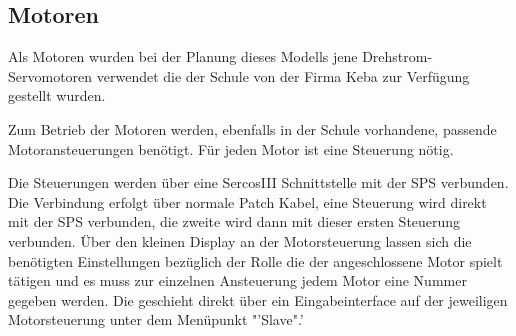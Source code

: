 \subsection{Motoren}
Als Motoren wurden bei der Planung dieses Modells jene Drehstrom-Servomotoren verwendet die der Schule von der Firma Keba zur Verfügung gestellt wurden. 

Zum Betrieb der Motoren werden, ebenfalls in der Schule vorhandene, passende Motoransteuerungen benötigt. Für jeden Motor ist eine Steuerung nötig. 

Die Steuerungen werden über eine SercosIII Schnittstelle mit der SPS verbunden. Die Verbindung erfolgt über normale Patch Kabel, eine Steuerung wird direkt mit der SPS verbunden, die zweite wird dann mit dieser ersten Steuerung verbunden. Über den kleinen Display an der Motorsteuerung lassen sich die benötigten Einstellungen bezüglich der Rolle die der angeschlossene Motor spielt tätigen und es muss zur einzelnen Ansteuerung jedem Motor eine Nummer gegeben werden. Die geschieht direkt über ein Eingabeinterface auf der jeweiligen Motorsteuerung unter dem Menüpunkt "'Slave".'